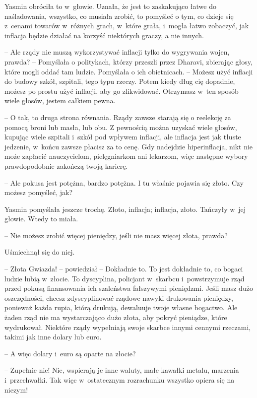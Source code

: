 \documentclass[oneside,polish,11pt,rmheadings]{mwbk}
\begin{document}
Yasmin obróciła to w~głowie. Uznała, że jest to zaskakująco łatwe do naśladowania, wszystko, co musiała zrobić, to pomyśleć o tym, co dzieje się z~cenami towarów w~różnych grach, w~które grała, i~mogła łatwo zobaczyć, jak inflacja będzie działać na korzyść niektórych graczy, a nie innych. 

-- Ale rządy nie muszą wykorzystywać inflacji tylko do wygrywania wojen, prawda? -- Pomyślała o politykach, którzy przeszli przez Dharavi, zbierając głosy, które mogli oddać tam ludzie. Pomyślała o ich obietnicach. -- Możesz użyć inflacji do budowy szkół, szpitali, tego typu rzeczy. Potem kiedy dług cię dopadnie, możesz po prostu użyć inflacji, aby go zlikwidować. Otrzymasz w~ten sposób wiele głosów, jestem całkiem pewna.

-- O tak, to druga strona równania. Rządy zawsze starają się o reelekcję za pomocą broni lub masła, lub obu. Z pewnością można uzyskać wiele głosów, kupując wiele szpitali i~szkół pod wpływem inflacji, ale inflacja jest jak tłuste jedzenie, w~końcu zawsze płacisz za to cenę. Gdy nadejdzie hiperinflacja, nikt nie może zapłacić nauczycielom, pielęgniarkom ani lekarzom, więc następne wybory prawdopodobnie zakończą twoją karierę.

-- Ale pokusa jest potężna, bardzo potężna. I tu właśnie pojawia się złoto. Czy możesz pomyśleć, jak?

Yasmin pomyślała jeszcze trochę. Złoto, inflacja; inflacja, złoto. Tańczyły w~jej głowie. Wtedy to miała. 

-- Nie możesz zrobić więcej pieniędzy, jeśli nie masz więcej złota, prawda?

Uśmiechnął się do niej. 

-- Złota Gwiazda! -- powiedział -- Dokładnie to. To jest dokładnie to, co bogaci ludzie lubią w~złocie. To dyscyplina, policjant w~skarbcu i~powstrzymuje rząd przed pokusą finansowania ich szaleństwa fałszywymi pieniędzmi. Jeśli masz dużo oszczędności, chcesz zdyscyplinować rządowe nawyki drukowania pieniędzy, ponieważ każda rupia, którą drukują, dewaluuje twoje własne bogactwo. Ale żaden rząd nie ma wystarczająco dużo złota, aby pokryć pieniądze, które wydrukował. Niektóre rządy wypełniają swoje skarbce innymi cennymi rzeczami, takimi jak inne dolary lub euro.

-- A więc dolary i~euro są oparte na złocie?

-- Zupełnie nie! Nie, wspierają je inne waluty, małe kawałki metalu, marzenia i~przechwałki. Tak więc w~ostatecznym rozrachunku wszystko opiera się na niczym!
\end{document}
